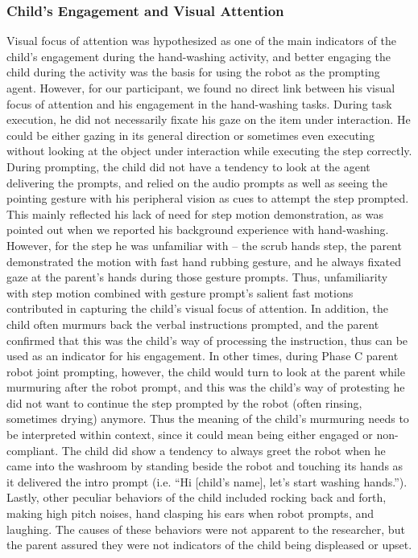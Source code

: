 \subsubsection{Child's Engagement and Visual Attention}
Visual focus of attention was hypothesized as one of the main indicators of the child's engagement during the hand-washing activity, and better engaging the child during the activity was the basis for using the robot as the prompting agent.  However, for our participant, we found no direct link between his visual focus of attention and his engagement in the hand-washing tasks.  During task execution, he did not necessarily fixate his gaze on the item under interaction.  He could be either gazing in its general direction or sometimes even executing without looking at the object under interaction while executing the step correctly.  During prompting, the child did not have a tendency to look at the agent delivering the prompts, and relied on the audio prompts as well as seeing the pointing gesture with his peripheral vision as cues to attempt the step prompted.  This mainly reflected his lack of need for step motion demonstration, as was pointed out when we reported his background experience with hand-washing.  However, for the step he was unfamiliar with -- the scrub hands step, the parent demonstrated the motion with fast hand rubbing gesture, and he always fixated gaze at the parent's hands during those gesture prompts.  Thus, unfamiliarity with step motion combined with gesture prompt's salient fast motions contributed in capturing the child's visual focus of attention.  In addition, the child often murmurs back the verbal instructions prompted, and the parent confirmed that this was the child's way of processing the instruction, thus can be used as an indicator for his engagement.  In other times, during Phase C parent robot joint prompting, however, the child would turn to look at the parent while murmuring after the robot prompt, and this was the child's way of protesting he did not want to continue the step prompted by the robot (often rinsing, sometimes drying) anymore.  Thus the meaning of the child's murmuring needs to be interpreted within context, since it could mean being either engaged or non-compliant.  The child did show a tendency to always greet the robot when he came into the washroom by standing beside the robot and touching its hands as it delivered the intro prompt (i.e. ``Hi [child's name], let's start washing hands.'').  Lastly, other peculiar behaviors of the child included rocking back and forth, making high pitch noises, hand clasping his ears when robot prompts, and laughing.  The causes of these behaviors were not apparent to the researcher, but the parent assured they were not indicators of the child being displeased or upset.

